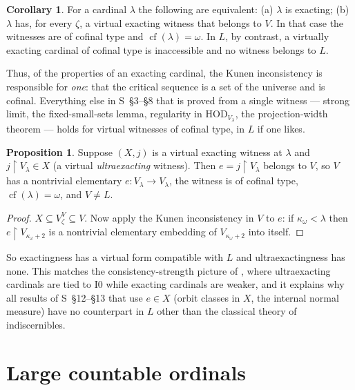 \documentclass[11pt,letterpaper]{article}
\theoremstyle{definition}
\newtheorem{proposition}[definition]{Proposition}
\newtheorem{corollary}[definition]{Corollary}
\numberwithin{equation}{section}
\newcommand{\HOD}{\mathrm{HOD}}
\newcommand{\cf}{\operatorname{cf}}
\newcommand{\restr}{\mathbin{\upharpoonright}}
\newcommand{\Izero}{\mathrm{I0}}
\begin{document}
\begin{corollary}\label{cor:kunen}
For a cardinal $\lambda$ the following are equivalent: (a) $\lambda$ is exacting; (b) $\lambda$ has, for every $\zeta$, a virtual exacting witness that belongs to $V$. In that case the witnesses are of cofinal type and $\cf(\lambda)=\omega$. In $L$, by contrast, a virtually exacting cardinal of cofinal type is inaccessible and no witness belongs to $L$.
\end{corollary}

Thus, of the properties of an exacting cardinal, the Kunen inconsistency is responsible for \emph{one}: that the critical sequence is a set of the universe and is cofinal. Everything else in S~\S3--\S8 that is proved from a single witness --- strong limit, the fixed-small-sets lemma, regularity in $\HOD_{V_\lambda}$, the projection-width theorem --- holds for virtual witnesses of cofinal type, in $L$ if one likes.

\begin{proposition}\label{prop:ultra}
Suppose $(X,j)$ is a virtual exacting witness at $\lambda$ and $j\restr V_\lambda\in X$ (a virtual \emph{ultraexacting} witness). Then $e=j\restr V_\lambda$ belongs to $V$, so $V$ has a nontrivial elementary $e:V_\lambda\to V_\lambda$, the witness is of cofinal type, $\cf(\lambda)=\omega$, and $V\ne L$.
\end{proposition}

\begin{proof}
$X\subseteq V_\zeta^V\subseteq V$. Now apply the Kunen inconsistency in $V$ to $e$: if $\kappa_\omega<\lambda$ then $e\restr V_{\kappa_\omega+2}$ is a nontrivial elementary embedding of $V_{\kappa_\omega+2}$ into itself.
\end{proof}

So exactingness has a virtual form compatible with $L$ and ultraexactingness has none. This matches the consistency-strength picture of \cite{abgl}, where ultraexacting cardinals are tied to $\Izero$ while exacting cardinals are weaker, and it explains why all results of S~\S12--\S13 that use $e\in X$ (orbit classes in $X$, the internal normal measure) have no counterpart in $L$ other than the classical theory of indiscernibles.

\section{Large countable ordinals}
\end{document}
